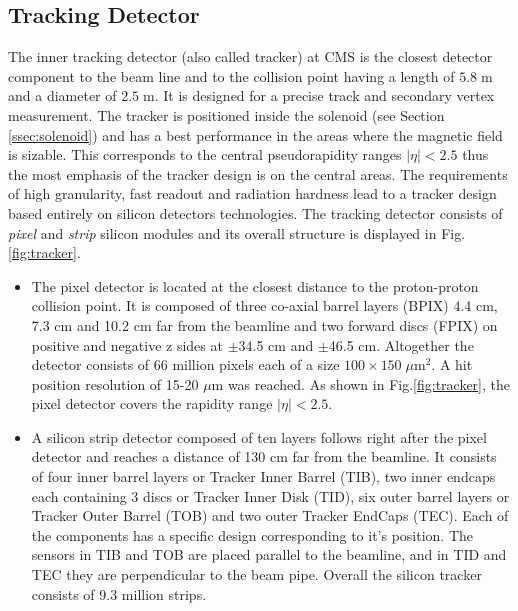 \subsection{Tracking Detector}\label{sec:tracker}

The inner tracking detector\cite{TrackerTDR, CMSatLHC} (also called tracker) at CMS is the closest detector component to the beam line and to the collision point having a
length of $5.8\;$m and a diameter of $2.5\;$m. It is designed for a precise track and secondary vertex measurement. 
The tracker is positioned inside the solenoid (see Section \ref{ssec:solenoid}) and has a best performance in the areas where the magnetic field
is sizable. This corresponds to the central pseudorapidity ranges $|\eta| < 2.5$ thus the most emphasis of the tracker design is on the central
areas. The requirements of high granularity, fast readout and radiation hardness lead to a tracker design based entirely on silicon
detectors technologies. The tracking detector consists of \textit{pixel} and \textit{strip} silicon modules
and its overall structure is displayed in Fig.\ref{fig:tracker}.

\begin{itemize}
 \item The pixel detector is located at the closest distance to the proton-proton collision point. It is composed of three co-axial barrel layers (BPIX)
 4.4 cm, 7.3 cm and 10.2 cm far from the beamline and two forward discs (FPIX) on positive and negative z sides
 at $\pm$34.5 cm and $\pm$46.5 cm. Altogether the detector consists of 66 million pixels each of a size $100 \times 150\;\mu$m$^2$. A hit
 position resolution of 15-20 $\mu$m was reached\cite{TrackPerf}.
 As shown in Fig.\ref{fig:tracker}, the pixel detector covers the rapidity range $|\eta| < 2.5$.
 
 \item A silicon strip detector composed of ten layers follows right after the pixel detector and reaches a distance of 130 cm far
 from the beamline. It consists of four inner barrel layers or Tracker Inner Barrel (TIB), two inner endcaps each containing 3 discs
 or Tracker Inner Disk (TID), six outer barrel layers or Tracker Outer Barrel (TOB) and two outer Tracker EndCaps (TEC).
 Each of the components has a specific design corresponding to it's position. The sensors in TIB and TOB are placed parallel to the
 beamline, and in TID and TEC they are perpendicular to the beam pipe. Overall the silicon tracker consists of 9.3
 million strips.
\end{itemize}

